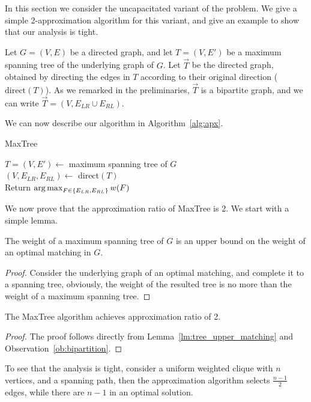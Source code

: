 \label{sub:ucudcm}
In this section we consider the uncapacitated variant of the problem. 
We give a simple 2-approximation algorithm for this variant, 
and give an example to show that our analysis is tight.

Let $G = (V, E)$ be a directed graph, 
and let $T = (V, E')$ be a maximum spanning tree of the underlying graph of $G$.
Let $\overrightarrow{T}$ be the directed graph, 
obtained by directing the edges in $T$ according to their original direction
($\text{direct}(T)$).
As we remarked in the preliminaries, 
$\overrightarrow{T}$ is a bipartite graph, 
and we can write $\overrightarrow{T} = (V, E_{LR} \cup E_{RL})$. 

We can now describe our algorithm in Algorithm~\ref{alg:apx}.

\begin{algorithm}
\caption{
\label{alg:apx}
MaxTree}
$T = (V, E') \leftarrow$ maximum spanning tree of $G$	\\
$(V, E_{LR}, E_{RL}) \leftarrow$ direct$(T)$			\\
Return $\operatorname*{arg\,max}_{F \in \{ E_{LR}, E_{RL} \}}{w(F)} $	\\
\end{algorithm}

We now prove that the approximation ratio of MaxTree is 2.
We start with a simple lemma.

\begin{lemma}
\label{lm:tree_upper_matching}
The weight of a maximum spanning tree of $G$ is an upper bound on the weight of
an optimal matching in $G$.
\end{lemma}

\begin{proof}
Consider the underlying graph of an optimal matching, 
and complete it to a spanning tree, obviously, the
weight of the resulted tree is no more than the weight of a maximum spanning
tree.
\end{proof}

\begin{theorem}
The MaxTree algorithm achieves approximation ratio of 2.
\end{theorem}

\begin{proof}
The proof follows directly from 
Lemma~\ref{lm:tree_upper_matching} and Observation~\ref{ob:bipartition}.
\end{proof}

To see that the analysis is tight, 
consider a uniform weighted clique with $n$ vertices, 
and a spanning path, 
then the approximation algorithm selects $\frac{n - 1}{2}$ edges, 
while there are $n - 1$ in an optimal solution.  